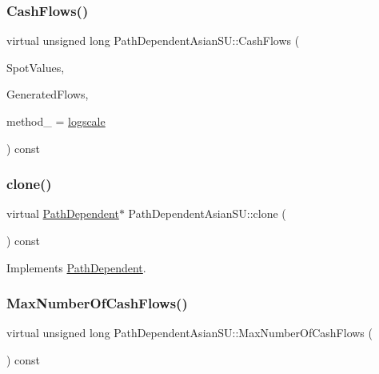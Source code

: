 \subsubsection{\texorpdfstring{Cash\+Flows()}{CashFlows()}}
{\footnotesize\ttfamily virtual unsigned long Path\+Dependent\+Asian\+S\+U\+::\+Cash\+Flows (\begin{DoxyParamCaption}\item[{const \hyperlink{classMJArray}{M\+J\+Array} \&}]{Spot\+Values,  }\item[{std\+::vector$<$ \hyperlink{classMyCashFlow_1_1CashFlow}{My\+Cash\+Flow\+::\+Cash\+Flow} $>$ \&}]{Generated\+Flows,  }\item[{\hyperlink{PathDependent_8h_abed946c62f140eb7ff2ac742e6ad9497}{method}}]{method\+\_\+ = {\ttfamily \hyperlink{PathDependent_8h_abed946c62f140eb7ff2ac742e6ad9497a064d3d3358889658ce07fe9f3191d1fd}{logscale}} }\end{DoxyParamCaption}) const\hspace{0.3cm}{\ttfamily [virtual]}}

\hypertarget{classPathDependentAsianSU_ad564b11ca89eba61b306dccdf824a93a}{}\label{classPathDependentAsianSU_ad564b11ca89eba61b306dccdf824a93a} 
\subsubsection{\texorpdfstring{clone()}{clone()}}
{\footnotesize\ttfamily virtual \hyperlink{classPathDependent}{Path\+Dependent}$\ast$ Path\+Dependent\+Asian\+S\+U\+::clone (\begin{DoxyParamCaption}{ }\end{DoxyParamCaption}) const\hspace{0.3cm}{\ttfamily [virtual]}}



Implements \hyperlink{classPathDependent_afcc10647f591175642c6dc0adba23f0b}{Path\+Dependent}.

\hypertarget{classPathDependentAsianSU_af02b751e82d9d1d153f17b67aeac1415}{}\label{classPathDependentAsianSU_af02b751e82d9d1d153f17b67aeac1415} 
\subsubsection{\texorpdfstring{Max\+Number\+Of\+Cash\+Flows()}{MaxNumberOfCashFlows()}}
{\footnotesize\ttfamily virtual unsigned long Path\+Dependent\+Asian\+S\+U\+::\+Max\+Number\+Of\+Cash\+Flows (\begin{DoxyParamCaption}{ }\end{DoxyParamCaption}) const\hspace{0.3cm}{\ttfamily [virtual]}}



